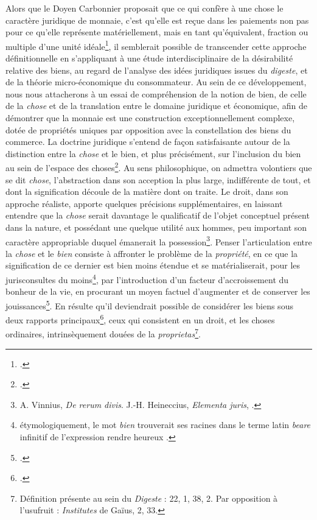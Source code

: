 {Alors que le Doyen Carbonnier proposait que \og ce qui confère à une chose le caractère juridique de monnaie, c'est qu'elle est reçue dans les paiements non pas pour ce qu'elle représente matériellement, mais en tant qu'équivalent, fraction ou multiple d'une unité idéale\fg{}\footnote{.}, il semblerait possible de transcender cette approche définitionnelle en s'appliquant à une étude interdisciplinaire de la désirabilité relative des biens, au regard de l'analyse des idées juridiques issues du \emph{\gls{digeste}},  et de la théorie micro-économique du consommateur. Au sein de ce développement, nous nous attacherons à un essai de compréhension de la notion de bien, de celle de la \emph{chose} et de la translation entre le domaine juridique et économique, afin de démontrer que la monnaie est une construction exceptionnellement complexe, dotée de propriétés uniques par opposition avec la constellation des biens du commerce. La doctrine juridique s'entend de façon satisfaisante autour de la distinction entre la \emph{chose} et le bien, et plus précisément, sur l'inclusion du bien au sein de l'espace des choses\footnote{.}. Au sens philosophique, on admettra volontiers que se dit \emph{chose}, l'abstraction dans son acception la plus large, indifférente de tout, et dont la signification découle de la matière dont on traite. Le droit, dans son approche réaliste, apporte quelques précisions supplémentaires, en laissant entendre que la \emph{chose} serait davantage le qualificatif de l'objet conceptuel présent dans la nature, et possédant une quelque utilité aux hommes, peu important son caractère appropriable duquel émanerait la possession\footnote{A. Vinnius, \emph{De rerum divis}. J.-H. Heineccius, \emph{Elementa juris}, .}. Penser l'articulation entre la \emph{chose} et le \emph{bien} consiste à affronter le problème de la \emph{propriété}, en ce que la signification de ce dernier est bien moins étendue et se matérialiserait, pour les jurisconsultes du moins\footnote{étymologiquement, le mot \emph{bien} trouverait ses racines dans le terme latin \emph{beare} infinitif de l'expression \og rendre heureux \fg{}.}, par l'introduction d'un facteur d'accroissement du bonheur de la vie, en procurant un moyen factuel d'augmenter et de conserver les jouissances\footnote{.}. En résulte qu'il deviendrait possible de considérer les biens sous deux rapports principaux\footnote{.}, ceux qui consistent en un droit, et les choses ordinaires, intrinsèquement douées de la \emph{proprietas}\footnote{Définition présente au sein du \emph{Digeste} : 22, 1, 38, 2. Par opposition à l'usufruit : \emph{Institutes} de Gaïus, 2, 33.}.\par

}
